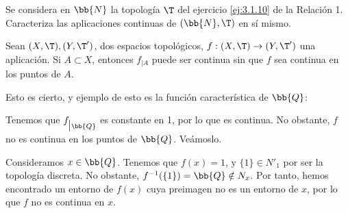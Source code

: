\begin{ejercicio}
    Se considera en $\bb{N}$ la topología $\T$ del ejercicio \ref{ej:3.1.10} de la Relación 1. Caracteriza las aplicaciones continuas de $(\bb{N},\T)$ en sí mismo.
\end{ejercicio}

\begin{ejercicio}
    Sean $(X, \T ), (Y, \T')$, dos espacios topológicos, $f : (X, \T ) \to (Y, \T')$ una aplicación. Si $A \subset X$, entonces $f_{\big| A}$ puede ser continua sin que $f$ sea continua en los puntos de $A$.

    Esto es cierto, y ejemplo de esto es la función característica de $\bb{Q}$:

    Tenemos que $f_{\big| \bb{Q}}$ es constante en 1, por lo que es continua. No obstante, $f$ no es continua en los puntos de $\bb{Q}$. Veámoslo.
    
    Consideramos $x\in \bb{Q}$. Tenemos que $f(x)=1$, y $\{1\}\in N'_1$ por ser la topología discreta. No obstante, $f^{-1}(\{1\})=\bb{Q}\notin N_x$. Por tanto, hemos encontrado un entorno de $f(x)$ cuya preimagen no es un entorno de $x$, por lo que $f$ no es continua en $x$.
\end{ejercicio}

